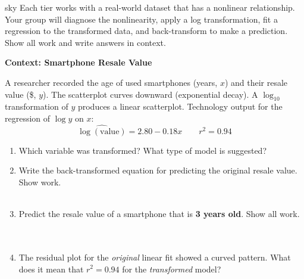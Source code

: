 \documentclass[10pt]{article}
\begin{document}
\namepartnerperiod

\vspace{0.18in}

\begin{scenariobox}[Context]{sky}
\small
Each tier works with a real-world dataset that has a nonlinear relationship. Your group will
diagnose the nonlinearity, apply a log transformation, fit a regression to the transformed
data, and back-transform to make a prediction. Show all work and write answers in context.
\end{scenariobox}

\vspace{0.12in}

\begin{tcolorbox}[colback=white, colframe=black!40, boxrule=0.8pt, arc=2mm,
    left=4mm, right=4mm, top=3mm, bottom=3mm,
    title={\textbf{Tier R --- Remediate}}, fonttitle=\bfseries, halign title=center]
\small

\textbf{Context: Smartphone Resale Value}

A researcher recorded the age of used smartphones (years, $x$) and their resale value
(\$, $y$). The scatterplot curves downward (exponential decay). A $\log_{10}$ transformation
of $y$ produces a linear scatterplot. Technology output for the regression of $\log y$ on $x$:
\[
  \widehat{\log(\text{value})} = 2.80 - 0.18x \qquad r^2 = 0.94
\]

\vspace{8pt}

\begin{enumerate}[leftmargin=1.6em, itemsep=0.18in]

  \item Which variable was transformed? \blank{3cm} \quad What type of model is suggested?
        \blank{4cm}

  \item Write the back-transformed equation for predicting the original resale value.
        Show work.\\[8pt]
        \writeline\\[3pt]\writeline

  \item Predict the resale value of a smartphone that is \textbf{3 years old}. Show all work.\\[8pt]
        \writeline\\[3pt]\writeline\\[3pt]\writeline

  \item The residual plot for the \textit{original} linear fit showed a curved pattern.
        What does it mean that $r^2 = 0.94$ for the \textit{transformed} model?\\[8pt]
        \writeline\\[3pt]\writeline

\end{enumerate}
\end{tcolorbox}
\end{document}
